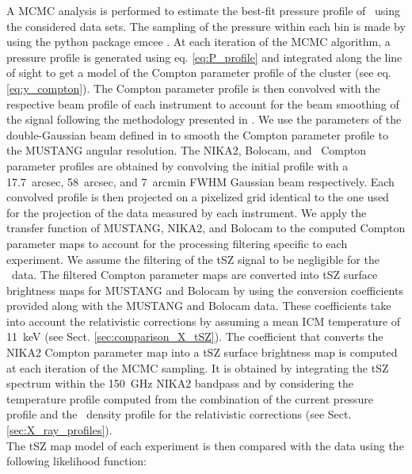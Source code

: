 \documentclass[traditabstract]{aa}
\begin{document}
\indent A MCMC analysis is performed to estimate the best-fit pressure profile of \psz\ using the considered data sets. The sampling of the pressure within each bin is made by using the python package emcee \citep{for13}. At each iteration of the MCMC algorithm, a pressure profile is generated using eq. \ref{eq:P_profile} and integrated along the line of sight to get a model of the Compton parameter profile of the cluster (see eq. \ref{eq:y_compton}). The Compton parameter profile is then convolved with the respective beam profile of each instrument to account for the beam smoothing of the signal following the methodology presented in \cite{bir94}. We use the parameters of the double-Gaussian beam defined in \cite{rom15} to smooth the Compton parameter profile to the MUSTANG angular resolution. The NIKA2, Bolocam, and \planck\ Compton parameter profiles are obtained by convolving the initial profile with a 17.7~arcsec, 58~arcsec, and 7~arcmin FWHM Gaussian beam respectively. Each convolved profile is then projected on a pixelized grid identical to the one used for the projection of the data measured by each instrument. We apply the transfer function of MUSTANG, NIKA2, and Bolocam to the computed Compton parameter maps to account for the processing filtering specific to each experiment. We assume the filtering of the tSZ signal to be negligible for the \planck\ data. The filtered Compton parameter maps are converted into tSZ surface brightness maps for MUSTANG and Bolocam by using the conversion coefficients provided along with the MUSTANG and Bolocam data. These coefficients take into account the relativistic corrections by assuming a mean ICM temperature of 11~keV (see Sect. \ref{sec:comparison_X_tSZ}). The coefficient that converts the NIKA2 Compton parameter map into a tSZ surface brightness map is computed at each iteration of the MCMC sampling. It is obtained by integrating the tSZ spectrum within the 150~GHz NIKA2 bandpass and by considering the temperature profile computed from the combination of the current pressure profile and the \xmm\ density profile for the relativistic corrections (see Sect. \ref{sec:X_ray_profiles}).\\
\indent The tSZ map model of each experiment is then compared with the data using the following likelihood function:
\end{document}
